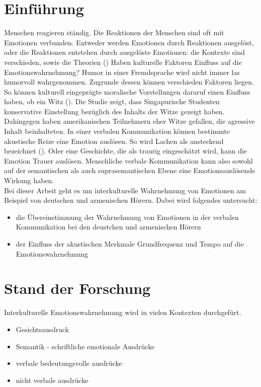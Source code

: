 \documentclass[11pt,a4paper,headsepline,twoside,toc=bibliography]{scrreprt}
\begin{document}
\chapter{Einführung}
\label{sec:einfuehrung}
Menschen reagieren ständig. Die Reaktionen der Menschen sind oft mit Emotionen verbunden. Entweder werden Emotionen durch Reaktionen ausgelöst, oder die Reaktionen entstehen durch ausgelöste Emotionen: die Kontexte sind verschieden, sowie die Theorien ()
Haben kulturelle Faktoren Einfluss auf die Emotionswahrnehmung? Humor in einer Fremdsprache wird nicht immer las humorvoll wahrgenommen. Zugrunde dessen können verschieden Faktoren liegen. So können kulturell eingeprägte moralische Vorstellungen dararuf einen Einfluss haben, ob ein Witz (\cite{Nevo2001}). Die Studie zeigt, dass Singapurische Studenten konservative Einstellung bezüglich des Inhalts der Witze gezeigt haben. Dahingegen haben amerikanischen Teilnehmern eher Witze gefallen, die agressive Inhalt beinhalteten. In einer verbalen Kommunikation können bestimmte akustische Reize eine Emotion auslösen. So wird Lachen als ansteckend bezeichnet (\cite{Provine1992}). Oder eine Geschichte, die als traurig eingeschätzt wird, kann die Emotion Trauer auslösen. Menschliche verbale Kommunikation kann also sowohl auf der semantischen als auch suprasemantischen Ebene eine Emotionsauslösende Wirkung haben.\\



Bei dieser Arbeit geht es um interkulturelle Wahrnehmung von Emotionen am Beispiel von deutschen und armenischen Hörern. Dabei wird folgendes untersucht:
\begin{itemize}
	\item die Übereinstimmung der Wahrnehmung von Emotionen in der verbalen Kommunikation bei den deustchen und armenischen Hörern 
	\item der Einfluss der akustischen Merkmale Grundfrequenz und Tempo auf die Emotionswahrnehmung 
\end{itemize}


\chapter{Stand der Forschung}
\label{sec:theory}

Interkulturelle Emotionswahrnehmung wird in vielen Kontexten durchgefürt. 

\begin{itemize}
	\item Gesichtsausdruck
	\item Semantik - schriftliche emotionale Ausdrücke
	\item verbale bedeutungsvolle ausdrücke
	\item nicht verbale ausdrücke  
	 
\end{itemize}
\end{document}
